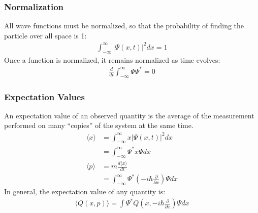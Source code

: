 \documentclass[11pt]{article}
\newcommand{\cc}[1]{
  \ensuremath{#1^{\ast}}}               %
\newcommand{\pd}[2]{
  \ensuremath{
    \frac{\partial #1}{\partial #2} }} %
\begin{document}
\begin{multicols*}{3}
\subsubsection{Normalization}
All wave functions must be normalized, so that the probability of finding the particle over all space is 1:
\begin{align*}
\int_{-\infty}^{\infty} |\Psi(x,t)|^2 dx = 1
\end{align*}
Once a function is normalized, it remains normalized as time evolves:
\begin{align*}
\frac{d}{dt} \int_{-\infty}^{\infty} \Psi \cc{\Psi} = 0
\end{align*}
\subsubsection{Expectation Values}
An expectation value of an observed quantity is the average of the measurement performed on many ``copies'' of the system at the same time.
\begin{align*}
\langle x\rangle &= \int_{-\infty}^{\infty} x |\Psi(x,t)|^2 dx \\
&= \int_{-\infty}^{\infty} \cc{\Psi} x \Psi dx \\
\langle p\rangle &= m\frac{d\langle x\rangle}{dt} \\
&= \int_{-\infty}^{\infty} \cc{\Psi} \left( -i\hbar \pd{}{x} \right) \Psi dx
\end{align*}
In general, the expectation value of any quantity is:
\begin{align*}
\langle Q(x, p) \rangle = \int \cc{\Psi} Q\left(x, -i\hbar\pd{}{x} \right) \Psi dx
\end{align*}


\end{multicols*}
\end{document}
